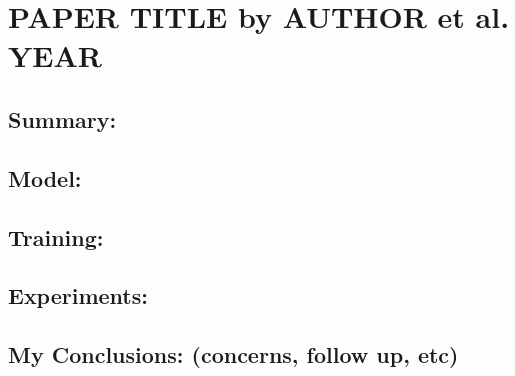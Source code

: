 \section{PAPER TITLE by AUTHOR et al. YEAR}

\subsection{Summary:}

\subsection{Model:}

\subsection{Training:}

\subsection{Experiments:}

\subsection{My Conclusions: (concerns, follow up, etc)}


